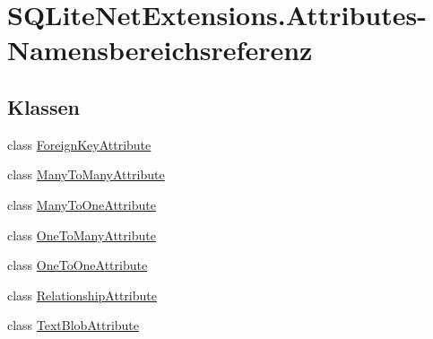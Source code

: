 \hypertarget{namespace_s_q_lite_net_extensions_1_1_attributes}{}\section{S\+Q\+Lite\+Net\+Extensions.\+Attributes-\/\+Namensbereichsreferenz}
\label{namespace_s_q_lite_net_extensions_1_1_attributes}
\subsection*{Klassen}
\begin{DoxyCompactItemize}
\item 
class \mbox{\hyperlink{class_s_q_lite_net_extensions_1_1_attributes_1_1_foreign_key_attribute}{Foreign\+Key\+Attribute}}
\item 
class \mbox{\hyperlink{class_s_q_lite_net_extensions_1_1_attributes_1_1_many_to_many_attribute}{Many\+To\+Many\+Attribute}}
\item 
class \mbox{\hyperlink{class_s_q_lite_net_extensions_1_1_attributes_1_1_many_to_one_attribute}{Many\+To\+One\+Attribute}}
\item 
class \mbox{\hyperlink{class_s_q_lite_net_extensions_1_1_attributes_1_1_one_to_many_attribute}{One\+To\+Many\+Attribute}}
\item 
class \mbox{\hyperlink{class_s_q_lite_net_extensions_1_1_attributes_1_1_one_to_one_attribute}{One\+To\+One\+Attribute}}
\item 
class \mbox{\hyperlink{class_s_q_lite_net_extensions_1_1_attributes_1_1_relationship_attribute}{Relationship\+Attribute}}
\item 
class \mbox{\hyperlink{class_s_q_lite_net_extensions_1_1_attributes_1_1_text_blob_attribute}{Text\+Blob\+Attribute}}
\end{DoxyCompactItemize}
